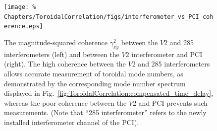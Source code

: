 \begin{figure}[h!]
  \centering
  \texttt{[image: \%
    Chapters/ToroidalCorrelation/figs/interferometer\_vs\_PCI\_coherence.eps]}
  \caption[Inability to correlate $V2$ and PCI]{%
    The magnitude-squared coherence $\gamma_{xy}^2$ between
    the $V2$ and 285 interferometers (left) and
    between the $V2$ interferometer and PCI (right).
    The high coherence between the $V2$ and 285 interferometers
    allows accurate measurement of toroidal mode numbers,
    as demonstrated by the corresponding mode number spectrum
    displayed in Fig.~\ref{fig:ToroidalCorrelation:compensated_time_delay},
    whereas the poor coherence between the $V2$ and PCI
    prevents such measurements.
    (Note that ``285 interferometer'' refers to
    the newly installed interferometer channel of the PCI).}
\label{fig:ToroidalCorrelation:PCI_coherence}
\end{figure}




